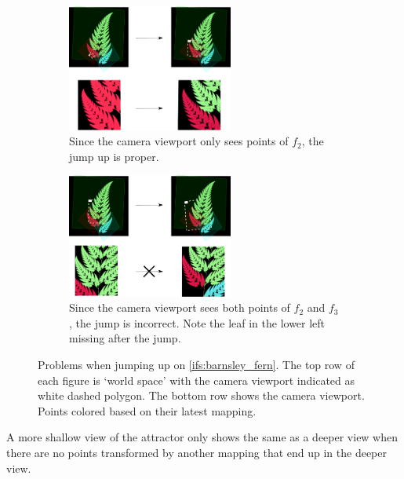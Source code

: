 \documentclass[11pt]{article}
\begin{document}
\begin{enumerate}
\begin{figure}
     \centering
     \begin{subfigure}[b]{\textwidth}
         \centering
         \includegraphics[width=0.6\textwidth]{figures/barnsley_colored_jump1}
         \caption{Since the camera viewport only sees points of $f_2$, the jump up is proper.}
         \label{figure:barnsley_jump_a}
     \end{subfigure}
     \hfill
     \begin{subfigure}[b]{\textwidth}
         \centering
         \includegraphics[width=0.6\textwidth]{figures/barnsley_colored_jump2}
         \caption{Since the camera viewport sees both points of $f_2$ and $f_3$, the jump is incorrect. Note the leaf in the lower left missing after the jump.}
         \label{figure:barnsley_jump_b}
     \end{subfigure}
        \caption{Problems when jumping up on \autoref{ifs:barnsley_fern}. The top row of each figure is `world space' with the camera viewport indicated as white dashed polygon. 
The bottom row shows the camera viewport.
Points colored based on their latest mapping. }
        \label{figure:barnsley_jump}
\end{figure}



A more shallow view of the attractor only shows the same as a deeper view when
there are no points transformed by another mapping that end up in the deeper view.


\end{enumerate}
\end{document}

